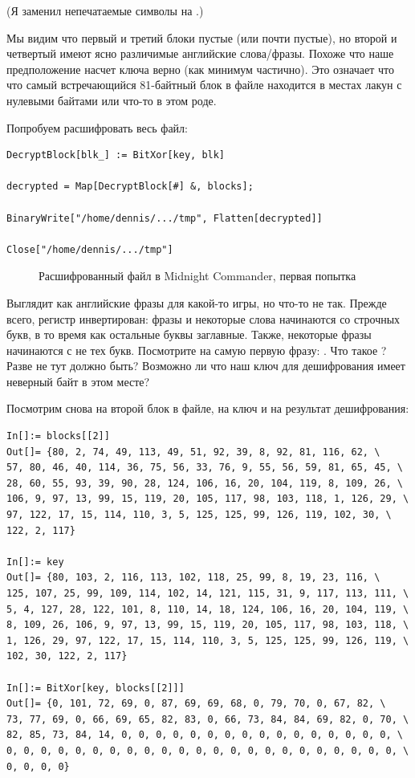 (Я заменил непечатаемые символы на .)

Мы видим что первый и третий блоки пустые (или почти пустые),
но второй и четвертый имеют ясно различимые английские слова/фразы.
Похоже что наше предположение насчет ключа верно (как минимум частично).
Это означает что что самый встречающийся 81-байтный блок в файле находится в местах лакун с нулевыми байтами
или что-то в этом роде.

Попробуем расшифровать весь файл:

\begin{lstlisting}[style=custommath]
DecryptBlock[blk_] := BitXor[key, blk]

decrypted = Map[DecryptBlock[#] &, blocks];

BinaryWrite["/home/dennis/.../tmp", Flatten[decrypted]]

Close["/home/dennis/.../tmp"]
\end{lstlisting}

\begin{figure}[H]
\centering
{}
\caption{Расшифрованный файл в Midnight Commander, первая попытка}
\end{figure}

Выглядит как английские фразы для какой-то игры, но что-то не так.
Прежде всего, регистр инвертирован: фразы и некоторые слова начинаются со строчных букв,
в то время как остальные буквы заглавные.
Также, некоторые фразы начинаются с не тех букв.
Посмотрите на самую первую фразу: .
Что такое ? Разве не  тут должно быть?
Возможно ли что наш ключ для дешифрования имеет неверный байт в этом месте?

Посмотрим снова на второй блок в файле, на ключ и на результат дешифрования:

\begin{lstlisting}[style=custommath]
In[]:= blocks[[2]]
Out[]= {80, 2, 74, 49, 113, 49, 51, 92, 39, 8, 92, 81, 116, 62, \
57, 80, 46, 40, 114, 36, 75, 56, 33, 76, 9, 55, 56, 59, 81, 65, 45, \
28, 60, 55, 93, 39, 90, 28, 124, 106, 16, 20, 104, 119, 8, 109, 26, \
106, 9, 97, 13, 99, 15, 119, 20, 105, 117, 98, 103, 118, 1, 126, 29, \
97, 122, 17, 15, 114, 110, 3, 5, 125, 125, 99, 126, 119, 102, 30, \
122, 2, 117}

In[]:= key
Out[]= {80, 103, 2, 116, 113, 102, 118, 25, 99, 8, 19, 23, 116, \
125, 107, 25, 99, 109, 114, 102, 14, 121, 115, 31, 9, 117, 113, 111, \
5, 4, 127, 28, 122, 101, 8, 110, 14, 18, 124, 106, 16, 20, 104, 119, \
8, 109, 26, 106, 9, 97, 13, 99, 15, 119, 20, 105, 117, 98, 103, 118, \
1, 126, 29, 97, 122, 17, 15, 114, 110, 3, 5, 125, 125, 99, 126, 119, \
102, 30, 122, 2, 117}

In[]:= BitXor[key, blocks[[2]]]
Out[]= {0, 101, 72, 69, 0, 87, 69, 69, 68, 0, 79, 70, 0, 67, 82, \
73, 77, 69, 0, 66, 69, 65, 82, 83, 0, 66, 73, 84, 84, 69, 82, 0, 70, \
82, 85, 73, 84, 14, 0, 0, 0, 0, 0, 0, 0, 0, 0, 0, 0, 0, 0, 0, 0, 0, \
0, 0, 0, 0, 0, 0, 0, 0, 0, 0, 0, 0, 0, 0, 0, 0, 0, 0, 0, 0, 0, 0, 0, \
0, 0, 0, 0}
\end{lstlisting}

